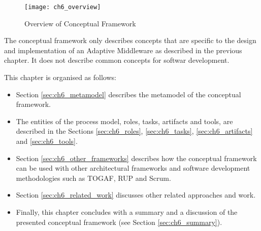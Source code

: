 \begin{figure}
	[htpb] \centering 
	\texttt{[image: ch6\_overview]} \caption{Overview of Conceptual Framework} \label{fig:ch6_overview} 
\end{figure}


The conceptual framework only describes concepts that are specific to the design and implementation of an Adaptive Middleware as described in the previous chapter. It does not describe common concepts for softwar development.

This chapter is organised as follows:

\begin{itemize}
	\item Section \ref{sec:ch6_metamodel} describes the metamodel of the conceptual framework.
	\item The entities of the process model, roles, tasks, artifacts and tools, are described in the Sections \ref{sec:ch6_roles}, \ref{sec:ch6_tasks}, \ref{sec:ch6_artifacts} and \ref{sec:ch6_tools}.
	\item Section \ref{sec:ch6_other_frameworks} describes how the conceptual framework can be used with other architectural frameworks and software development methodologies such as TOGAF, \acf{RUP} and Scrum.
	\item Section \ref{sec:ch6_related_work} discusses other related approaches and work.
	\item Finally, this chapter concludes with a summary and a discussion of the presented conceptual framework (see Section \ref{sec:ch6_summary}).
\end{itemize}

